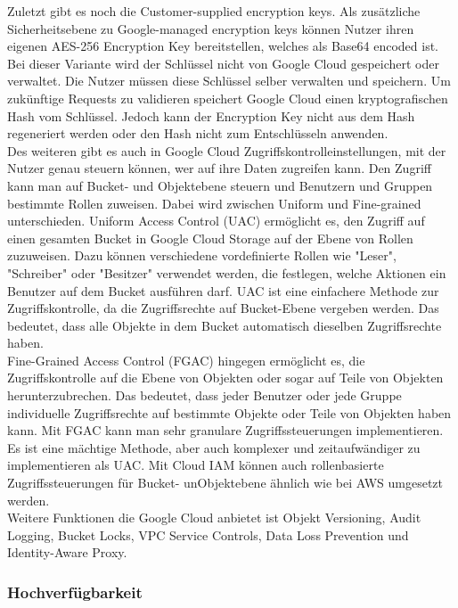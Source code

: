 Zuletzt gibt es noch die Customer-supplied encryption keys. Als zusätzliche Sicherheitsebene zu Google-managed encryption keys können Nutzer ihren eigenen AES-256 Encryption Key bereitstellen, welches als Base64 encoded ist. Bei dieser Variante wird der Schlüssel nicht von Google Cloud gespeichert oder verwaltet. Die Nutzer müssen diese Schlüssel selber verwalten und speichern. Um zukünftige Requests zu validieren speichert Google Cloud einen kryptografischen Hash vom Schlüssel. Jedoch kann der Encryption Key nicht aus dem Hash regeneriert werden oder den Hash nicht zum Entschlüsseln anwenden.\\

Des weiteren gibt es auch in Google Cloud Zugriffskontrolleinstellungen, mit der Nutzer genau steuern können, wer auf ihre Daten zugreifen kann. Den Zugriff kann man auf Bucket- und Objektebene steuern und Benutzern und Gruppen bestimmte Rollen zuweisen. Dabei wird zwischen Uniform und Fine-grained unterschieden. Uniform Access Control (UAC) ermöglicht es, den Zugriff auf einen gesamten Bucket in Google Cloud Storage auf der Ebene von Rollen zuzuweisen. Dazu können verschiedene vordefinierte Rollen wie "Leser", "Schreiber" oder "Besitzer" verwendet werden, die festlegen, welche Aktionen ein Benutzer auf dem Bucket ausführen darf. UAC ist eine einfachere Methode zur Zugriffskontrolle, da die Zugriffsrechte auf Bucket-Ebene vergeben werden. Das bedeutet, dass alle Objekte in dem Bucket automatisch dieselben Zugriffsrechte haben.\\

Fine-Grained Access Control (FGAC) hingegen ermöglicht es, die Zugriffskontrolle auf die Ebene von Objekten oder sogar auf Teile von Objekten herunterzubrechen. Das bedeutet, dass jeder Benutzer oder jede Gruppe individuelle Zugriffsrechte auf bestimmte Objekte oder Teile von Objekten haben kann. Mit FGAC kann man sehr granulare Zugriffssteuerungen implementieren. Es ist eine mächtige Methode, aber auch komplexer und zeitaufwändiger zu implementieren als UAC. Mit Cloud IAM können auch rollenbasierte Zugriffssteuerungen für Bucket- unObjektebene ähnlich wie bei AWS umgesetzt werden.\\

Weitere Funktionen die Google Cloud anbietet ist Objekt Versioning, Audit Logging, Bucket Locks, VPC Service Controls, Data Loss Prevention und Identity-Aware Proxy.

\newpage

\subsubsection{Hochverfügbarkeit}

